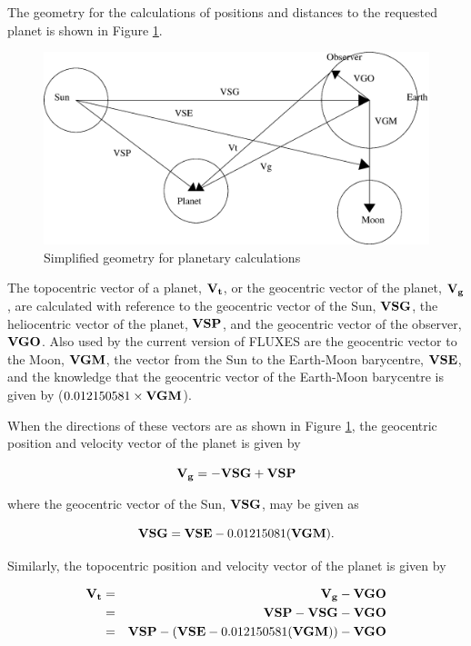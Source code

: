 \documentclass[11pt,twoside]{article}
\renewcommand{\_}{\texttt{\symbol{95}}}
\begin{document}
The geometry for the calculations of positions and distances to the requested planet is shown in Figure \ref{fig:geom}.

\begin{figure}
\includegraphics[width=\textwidth]{sun213_fig2.eps}
\vspace*{-0.5cm}
\caption{Simplified geometry for planetary calculations}
\label{fig:geom}
\end{figure}

The topocentric vector of a planet, $\bf{V_t}$, or the geocentric vector of the planet, $\bf{V_g}$, are calculated with reference to the geocentric vector of the Sun, $\bf{VSG}$, the heliocentric vector of the planet, $\bf{VSP}$, and the geocentric vector of the observer, $\bf{VGO}$.  Also used by the current version of FLUXES are the geocentric vector to the Moon, $\bf{VGM}$, the vector from the Sun to the Earth-Moon barycentre, $\bf{VSE}$, and the knowledge that the geocentric vector of the Earth-Moon barycentre is given by ($0.012150581 \times \bf{VGM}$).

When the directions of these vectors are as shown in Figure \ref{fig:geom}, the geocentric position and velocity vector of the planet is given by

\begin{displaymath}
\bf{V_g} = - \bf{VSG} + \bf{VSP}
\end{displaymath}

where the geocentric vector of the Sun, $\bf{VSG}$, may be given as

\begin{displaymath}
{\bf{VSG}} = {\bf{VSE}} - 0.01215081 ({\bf{VGM}}).
\end{displaymath}

Similarly, the topocentric position and velocity vector of the planet is given by

\begin{eqnarray*}
\bf{V_t} & = & \bf{V_g} - \bf{VGO}\\
& = & \bf{VSP} - \bf{VSG} - \bf{VGO}\\
& = & {\bf{VSP}} - ({\bf{VSE}} - 0.012150581 ({\bf{VGM}})) - {\bf{VGO}}
\end{eqnarray*}
\end{document}
